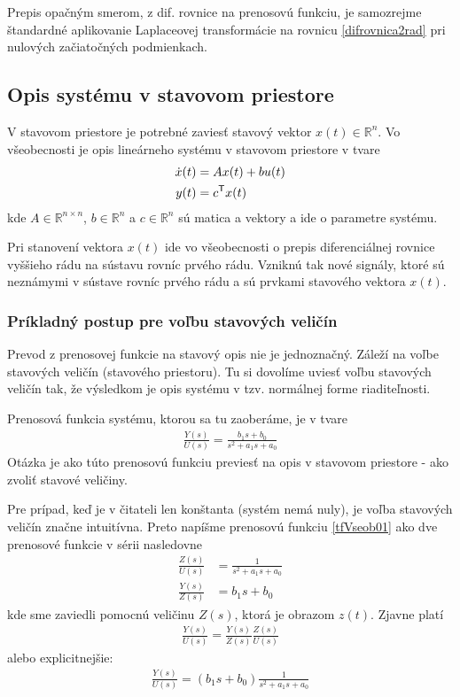 \documentclass[a4paper, 10pt, ]{article}
\begin{document}
Prepis opačným smerom, z dif. rovnice na prenosovú funkciu, je samozrejme štandardné aplikovanie Laplaceovej transformácie na rovnicu \eqref{difrovnica2rad} pri nulových začiatočných podmienkach.



\subsection{Opis systému v stavovom priestore}

V stavovom priestore je potrebné zaviesť stavový vektor $x(t) \in \mathbb R^n$. Vo všeobecnosti je opis lineárneho systému v stavovom priestore v tvare
\begin{subequations}
\begin{align}
    \dot x(t) &= A x(t) + b u(t) \\
    y(t) &= c^{\mathsf{T}} x(t) 
\end{align}
\end{subequations}
kde $A \in \mathbb R^{n \times n}$, $b \in \mathbb R^n$ a $c \in \mathbb R^n$ sú matica a vektory a ide o parametre systému.

Pri stanovení vektora $x(t)$ ide vo všeobecnosti o prepis diferenciálnej rovnice vyššieho rádu na sústavu rovníc prvého rádu. Vzniknú tak nové signály, ktoré sú neznámymi v sústave rovníc prvého rádu a sú prvkami stavového vektora $x(t)$.


\subsubsection{Príkladný postup pre voľbu stavových veličín}

Prevod z prenosovej funkcie na stavový opis nie je jednoznačný. Záleží na voľbe stavových veličín (stavového priestoru). Tu si dovolíme uviesť voľbu stavových veličín tak, že výsledkom je opis systému v tzv. normálnej forme riaditeľnosti.

Prenosová funkcia systému, ktorou sa tu zaoberáme, je v tvare
\begin{align} \label{tfVseob01}
	\frac{Y(s)}{U(s)} = \frac{b_1 s + b_0}{ s^2 + a_1 s + a_0}
\end{align}
Otázka je ako túto prenosovú funkciu previesť na opis v stavovom priestore - ako zvoliť stavové veličiny.

Pre prípad, keď je v čitateli len konštanta (systém nemá nuly), je voľba stavových veličín značne intuitívna. Preto napíšme prenosovú funkciu \eqref{tfVseob01} ako dve prenosové funkcie v sérii nasledovne
\begin{align}
	\frac{Z(s)}{U(s)} &= \frac{1}{ s^2 + a_1 s + a_0} \label{tfVseob02a} \\
    \frac{Y(s)}{Z(s)} &= b_1 s + b_0 \label{tfVseob02b}
\end{align}
kde sme zaviedli pomocnú veličinu $Z(s)$, ktorá je obrazom $z(t)$. Zjavne platí
\begin{align}
    \frac{Y(s)}{U(s)} = \frac{Y(s)}{Z(s)} \frac{Z(s)}{U(s)}
\end{align}
alebo explicitnejšie:
\begin{align}
    \frac{Y(s)}{U(s)} = \left( b_1 s + b_0 \right) \frac{1}{ s^2 + a_1 s + a_0}
\end{align}
\end{document}
